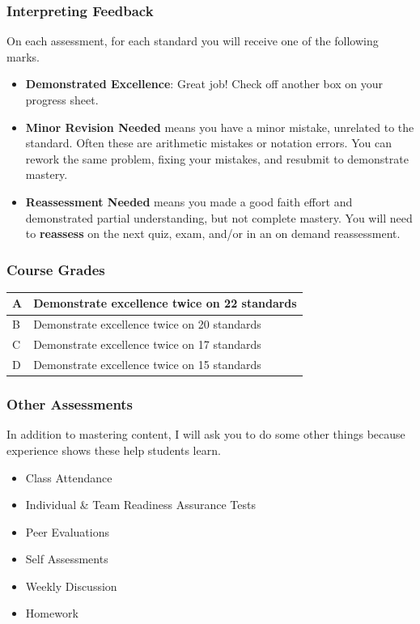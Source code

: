 \documentclass[aspectration=1610]{beamer}
\begin{document}
\begin{frame}\frametitle{Interpreting Feedback}
On each assessment, for each standard you will receive one of the following marks.
\begin{itemize}
\item {\bf Demonstrated Excellence}: Great job!  Check off another box on your progress sheet.
\item {\bf Minor Revision Needed} means you have a minor mistake, unrelated to the standard. Often these are arithmetic mistakes or notation errors. You can rework the same problem, fixing your mistakes, and resubmit to demonstrate mastery.
\item {\bf Reassessment Needed} means you made a good faith effort and demonstrated
      partial understanding, but not complete mastery. You will need to \textbf{reassess} on the next quiz, exam, and/or in an on demand reassessment.
\end{itemize}

\vspace{0.2in}

\end{frame}




\begin{frame}\frametitle{Course Grades}

\begin{center}
\begin{tabular}{ll} \hline
A & Demonstrate excellence twice on 22 standards\\ \hline
B & Demonstrate excellence twice on 20 standards\\ \hline
C & Demonstrate excellence twice on 17 standards\\ \hline
D & Demonstrate excellence twice on 15 standards\\ \hline
\end{tabular}
\end{center}

\end{frame}


\begin{frame}\frametitle{Other Assessments}
In addition to mastering content, I will ask you to do some other things because experience shows these help students learn.
\begin{itemize}
\item Class Attendance
\item Individual \& Team Readiness Assurance Tests
\item Peer Evaluations
\item Self Assessments
\item Weekly Discussion
\item Homework
\end{itemize}
\end{frame}
\end{document}

